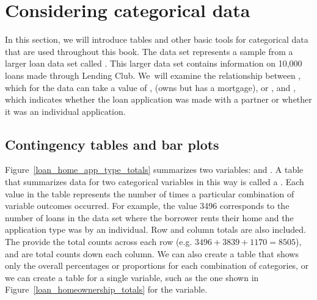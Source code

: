 


\section{Considering categorical data}
\label{categoricalData}


In this section, we will introduce tables and other basic tools
for categorical data that are used throughout this book.
The  data set represents a sample from a larger
loan data set called .
This larger data set contains information on 10,000 loans made
through Lending Club.
We~will examine the relationship between
, which for the  data can take
a value of , 
(owns but has a mortgage), or ,
and ,
which indicates whether the loan application was made
with a partner or whether it was an individual application.


\subsection{Contingency tables and bar plots}

\newcommand{\loanapphomeAA}{3496}
\newcommand{\loanapphomeAB}{3839}
\newcommand{\loanapphomeAC}{1170}
\newcommand{\loanapphomeAD}{8505}
\newcommand{\loanapphomeBA}{362}
\newcommand{\loanapphomeBB}{950}
\newcommand{\loanapphomeBC}{183}
\newcommand{\loanapphomeBD}{1495}
\newcommand{\loanapphomeDA}{3858}
\newcommand{\loanapphomeDAPt}{0.3858} %
\newcommand{\loanapphomeDB}{4789}
\newcommand{\loanapphomeDC}{1353}
\newcommand{\loanapphomeDD}{10000}
\newcommand{\loanapphomeN}{\loanapphomeDD{}}

Figure~\ref{loan_home_app_type_totals} summarizes two variables:
 and .
A table that summarizes data for two categorical variables in
this way is called a .
Each value in the table represents the number of times
a particular combination of variable outcomes occurred.
For example, the value \loanapphomeAA{} corresponds to the number of
loans in the data set where the borrower rents their home
and the application type was by an individual.
Row and column totals are also included.
The  
provide the total counts across each row
(e.g. $\loanapphomeAA{} + \loanapphomeAB{} +
  \loanapphomeAC{} = \loanapphomeAD{}$),
and  
are total counts down each column.
We can also create a table that shows only the overall 
percentages or proportions for each combination of categories,
or we can create a table for a single variable,
such as the one shown in Figure~\ref{loan_homeownership_totals}
for the  variable.

